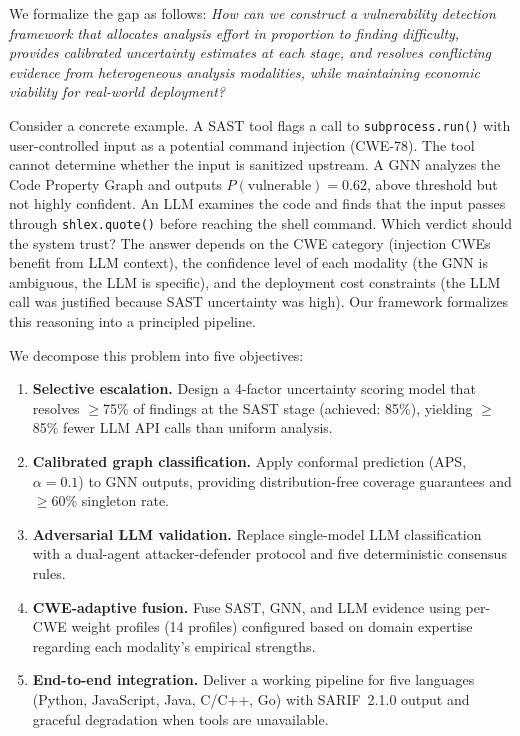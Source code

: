 We formalize the gap as follows: \textit{How can we construct a vulnerability detection framework that allocates analysis effort in proportion to finding difficulty, provides calibrated uncertainty estimates at each stage, and resolves conflicting evidence from heterogeneous analysis modalities, while maintaining economic viability for real-world deployment?}

Consider a concrete example. A SAST tool flags a call to \texttt{subprocess.run()} with user-controlled input as a potential command injection (CWE-78). The tool cannot determine whether the input is sanitized upstream. A GNN analyzes the Code Property Graph and outputs $P(\text{vulnerable}) = 0.62$, above threshold but not highly confident. An LLM examines the code and finds that the input passes through \texttt{shlex.quote()} before reaching the shell command. Which verdict should the system trust? The answer depends on the CWE category (injection CWEs benefit from LLM context), the confidence level of each modality (the GNN is ambiguous, the LLM is specific), and the deployment cost constraints (the LLM call was justified because SAST uncertainty was high). Our framework formalizes this reasoning into a principled pipeline.

We decompose this problem into five objectives:

\begin{enumerate}
    \item \textbf{Selective escalation.} Design a 4-factor uncertainty scoring model that resolves $\geq$75\% of findings at the SAST stage (achieved: 85\%), yielding $\geq$85\% fewer LLM API calls than uniform analysis.
    \item \textbf{Calibrated graph classification.} Apply conformal prediction (APS, $\alpha{=}0.1$) to GNN outputs, providing distribution-free coverage guarantees and $\geq$60\% singleton rate.
    \item \textbf{Adversarial LLM validation.} Replace single-model LLM classification with a dual-agent attacker-defender protocol and five deterministic consensus rules.
    \item \textbf{CWE-adaptive fusion.} Fuse SAST, GNN, and LLM evidence using per-CWE weight profiles (14 profiles) configured based on domain expertise regarding each modality's empirical strengths.
    \item \textbf{End-to-end integration.} Deliver a working pipeline for five languages (Python, JavaScript, Java, C/C++, Go) with SARIF~2.1.0 output and graceful degradation when tools are unavailable.
\end{enumerate}


